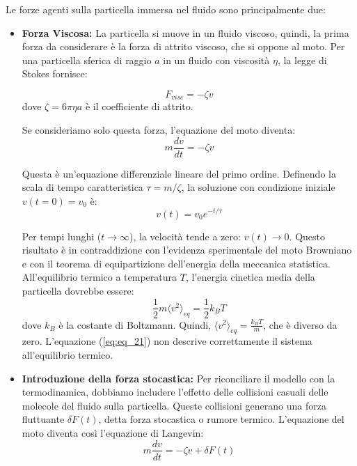 Le forze agenti sulla particella immersa nel fluido sono principalmente due:
\begin{itemize}
    \item \textbf{Forza Viscosa:} La particella si muove in un fluido viscoso, quindi, la prima forza da considerare è la forza di attrito viscoso, che si oppone al moto. Per una particella sferica di raggio $a$ in un fluido con viscosità $\eta$, la legge di Stokes fornisce:

\begin{equation}
F_{visc} = -\zeta v
\end{equation}
dove $\zeta = 6\pi \eta a$ è il coefficiente di attrito.

Se consideriamo solo questa forza, l'equazione del moto diventa:
\begin{equation}
m \frac{dv}{dt} = -\zeta v
\end{equation}

Questa è un'equazione differenziale lineare del primo ordine. Definendo la scala di tempo caratteristica $\tau = m/\zeta$, la soluzione con condizione iniziale $v(t=0)=v_0$ è:
\begin{equation}
\label{eq:eq_21}
v(t) = v_0 e^{-t/\tau}
\end{equation}

Per tempi lunghi ($t \to \infty$), la velocità tende a zero: $v(t) \to 0$. Questo risultato è in contraddizione con l'evidenza sperimentale del moto Browniano e con il teorema di equipartizione dell'energia della meccanica statistica. All'equilibrio termico a temperatura $T$, l'energia cinetica media della particella dovrebbe essere:
\begin{equation}
\frac{1}{2} m \langle v^2 \rangle_{eq} = \frac{1}{2} k_B T
\end{equation}
dove $k_B$ è la costante di Boltzmann. Quindi, $\langle v^2 \rangle_{eq} = \frac{k_B T}{m}$, che è diverso da zero. L'equazione (\ref{eq:eq_21}) non descrive correttamente il sistema all'equilibrio termico.

\item \textbf{Introduzione della forza stocastica:} Per riconciliare il modello con la termodinamica, dobbiamo includere l'effetto delle collisioni casuali delle molecole del fluido sulla particella. Queste collisioni generano una forza fluttuante $\delta F(t)$, detta forza stocastica o rumore termico. L'equazione del moto diventa così l'equazione di Langevin:
\begin{equation}
m \frac{dv}{dt} = -\zeta v + \delta F(t)
\end{equation}

\end{itemize}

